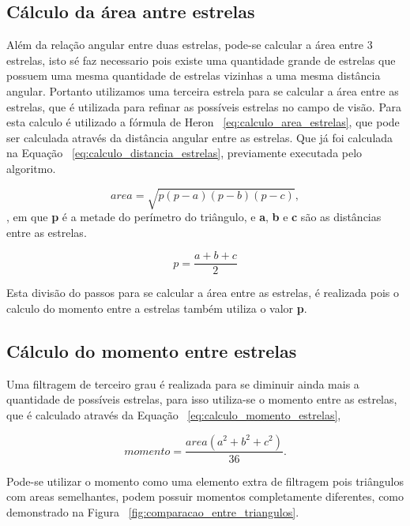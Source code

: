 \subsection{Cálculo da área antre estrelas}

Além da relação angular entre duas estrelas, pode-se calcular a área entre 3 estrelas, 
isto sé faz necessario pois existe uma quantidade grande de estrelas que possuem uma mesma quantidade de estrelas vizinhas a uma mesma distância angular.
Portanto utilizamos uma terceira estrela para se calcular a área entre as estrelas, que é utilizada para refinar as possíveis estrelas no campo de visão.
Para esta calculo é utilizado a fórmula de Heron ~\ref{eq:calculo_area_estrelas}, que pode ser calculada através da distância angular entre as estrelas.
Que já foi calculada na Equação ~\ref{eq:calculo_distancia_estrelas}, previamente executada pelo algoritmo.

\begin{equation}
	area = \sqrt{p(p-a)(p-b)(p-c)},
	\label{eq:calculo_area_estrelas}
\end{equation},
em que \textbf{p} é a metade do perímetro do triângulo, e \textbf{a}, \textbf{b} e \textbf{c} são as distâncias entre as estrelas.

\begin{equation}
	p = \frac{a+b+c}{2}
	\label{eq:calculo_area_estrelas_p}
\end{equation}

Esta divisão do passos para se calcular a área entre as estrelas, 
é realizada pois o calculo do momento entre a estrelas também utiliza o valor \textbf{p}.

\subsection{Cálculo do momento entre estrelas}

Uma filtragem de terceiro grau é realizada para se diminuir ainda mais a quantidade de possíveis estrelas, 
para isso utiliza-se o momento entre as estrelas, que é calculado através da Equação ~\ref{eq:calculo_momento_estrelas},

\begin{equation}
	momento = \frac{area (a^2 + b^2 + c^2)}{36}.
	\label{eq:calculo_momento_estrelas}
\end{equation}

Pode-se utilizar o momento como uma elemento extra de filtragem pois triângulos com areas semelhantes, podem possuir momentos completamente diferentes, como demonstrado na Figura ~\ref{fig:comparacao_entre_triangulos}.

